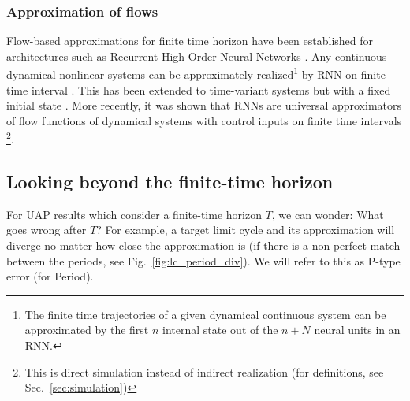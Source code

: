 \documentclass{article}
\theoremstyle{definition} \newtheorem{definition}{Definition}
\theoremstyle{remark} \newtheorem{remark}{Remark}
\newcommand{\reals}{\mathbb{R}}
\newcounter{ct}
\begin{document}




\subsubsection{Approximation of flows}%
Flow-based approximations for finite time horizon have been established for architectures such as Recurrent High-Order Neural Networks \citep{kosmatopoulos1995structural}.
Any continuous dynamical nonlinear systems can be approximately realized\footnote{The finite time trajectories of a given dynamical continuous system can be approximated by the first $n$ internal state out of the $n + N$ neural units in an RNN.} by RNN on finite time interval \citep{chow2000modeling}.
%
This has been extended to time-variant systems but with a fixed initial state \citep{li2005approximation}. %
%
More recently, it was shown that RNNs are universal approximators of flow functions of dynamical systems  with control inputs on finite time intervals  \citep{aguiar2023universal}\footnote{This is direct simulation instead of indirect realization (for definitions, see Sec.~\ref{sec:simulation})}. %



\subsection{Looking beyond the finite-time horizon}\label{sec:beyondfinitetime}

For UAP results which consider a finite-time horizon $T$, we can wonder: What goes wrong after $T$?
%
For example, a target limit cycle and its approximation will diverge no matter how close the approximation is (if there is a non-perfect match between the periods, see Fig.~\ref{fig:lc_period_div}).
We will refer to this as P-type error (for Period).
\end{document}
